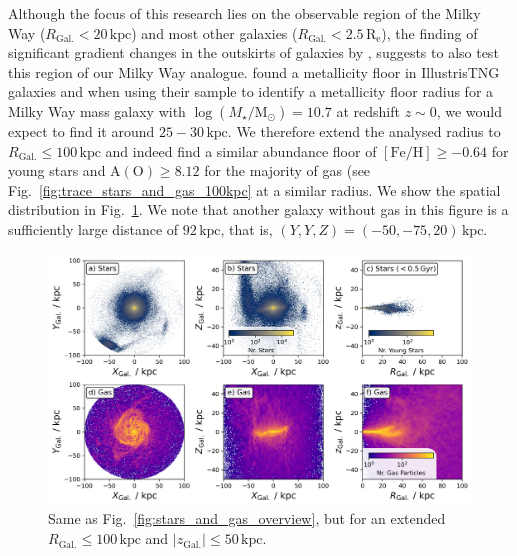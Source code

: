 \documentclass[twocolumn,apj,numberedappendix,appendixfloats,twocolappendix]{openjournal}
\begin{document}
\begin{CJK*}{UTF8}{gbsn}
Although the focus of this research lies on the observable region of the Milky Way ($R_\mathrm{Gal.} < 20\,\mathrm{kpc}$) and most other galaxies ($R_\mathrm{Gal.} < 2.5\,\mathrm{R_e}$), the finding of significant gradient changes in the outskirts of galaxies by \citet{Garcia2023}, suggests to also test this region of our Milky Way analogue. \citet[][see their Fig.~4]{Garcia2023} found a metallicity floor in IllustrisTNG galaxies and when using their sample to identify a metallicity floor radius for a Milky Way mass galaxy with $\log(M_\star/\mathrm{M_\odot}) = 10.7$ \citep{BlandHawthorn_Gerhard2016} at redshift $z \sim 0$, we would expect to find it around $25-30\,\mathrm{kpc}$. We therefore extend the analysed radius to $R_\mathrm{Gal.} \leq 100\,\mathrm{kpc}$ and indeed find a similar abundance floor of $\mathrm{[Fe/H]} \geq -0.64$ for young stars and $\mathrm{A(O)} \geq 8.12$ for the majority of gas (see Fig.~\ref{fig:trace_stars_and_gas_100kpc} at a similar radius. We show the spatial distribution in Fig.~\ref{fig:stars_and_gas_overview_100kpc}. We note that another galaxy without gas in this figure is a sufficiently large distance of $92\,\mathrm{kpc}$, that is, $(Y,Y,Z) = (-50,-75,20)\,\mathrm{kpc}$.

\begin{figure}
    \centering
    \includegraphics[width=\textwidth]{figures/stars_and_gas_overview_100kpc.png}
    \caption{Same as Fig.~\ref{fig:stars_and_gas_overview}, but for an extended $R_\mathrm{Gal.} \leq 100\,\mathrm{kpc}$ and $\vert z_\mathrm{Gal.} \vert \leq 50\,\mathrm{kpc}$.}
    \label{fig:stars_and_gas_overview_100kpc}
\end{figure}


\end{CJK*}
\end{document}
